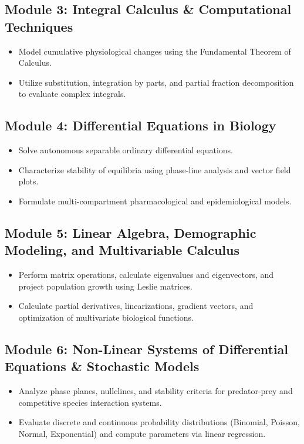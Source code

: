 \documentclass[10pt,letterpaper]{article}
\begin{document}
\subsection*{Module 3: Integral Calculus \& Computational Techniques}
\begin{itemize}[noitemsep]
    \item Model cumulative physiological changes using the Fundamental Theorem of Calculus.
    \item Utilize substitution, integration by parts, and partial fraction decomposition to evaluate complex integrals.
\end{itemize}

\subsection*{Module 4: Differential Equations in Biology}
\begin{itemize}[noitemsep]
    \item Solve autonomous separable ordinary differential equations.
    \item Characterize stability of equilibria using phase-line analysis and vector field plots.
    \item Formulate multi-compartment pharmacological and epidemiological models.
\end{itemize}

\subsection*{Module 5: Linear Algebra, Demographic Modeling, and Multivariable Calculus}
\begin{itemize}[noitemsep]
    \item Perform matrix operations, calculate eigenvalues and eigenvectors, and project population growth using Leslie matrices.
    \item Calculate partial derivatives, linearizations, gradient vectors, and optimization of multivariate biological functions.
\end{itemize}

\subsection*{Module 6: Non-Linear Systems of Differential Equations \& Stochastic Models}
\begin{itemize}[noitemsep]
    \item Analyze phase planes, nullclines, and stability criteria for predator-prey and competitive species interaction systems.
    \item Evaluate discrete and continuous probability distributions (Binomial, Poisson, Normal, Exponential) and compute parameters via linear regression.
\end{itemize}
\end{document}
